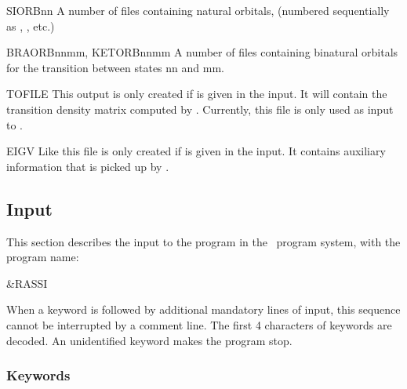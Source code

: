 \begin{filelist}
\item[SIORBnn]
A number of files containing natural orbitals, (numbered sequentially as
, , etc.)
\item[BRAORBnnmm, KETORBnnmm]
A number of files containing binatural orbitals for the transition between
states nn and mm.
\item[TOFILE]
This output is only created if  is given in the input.
It will contain the transition density matrix computed by .
Currently, this file is only used as input to .
\item[EIGV]
Like  this file is only created if  is given
in the input. It contains auxiliary information that is picked up
by .
\end{filelist}

\subsection{Input}
\label{UG:sec:rassi_input}
This section describes the input to the
 program in the \molcas\ program system,
with the program name:
\begin{inputlisting}
 &RASSI
\end{inputlisting}

When a keyword is followed by additional mandatory lines of input,
this sequence cannot be interrupted by a comment line. The first 4
characters of keywords are decoded. An unidentified keyword makes the
program stop.

\subsubsection{Keywords}

